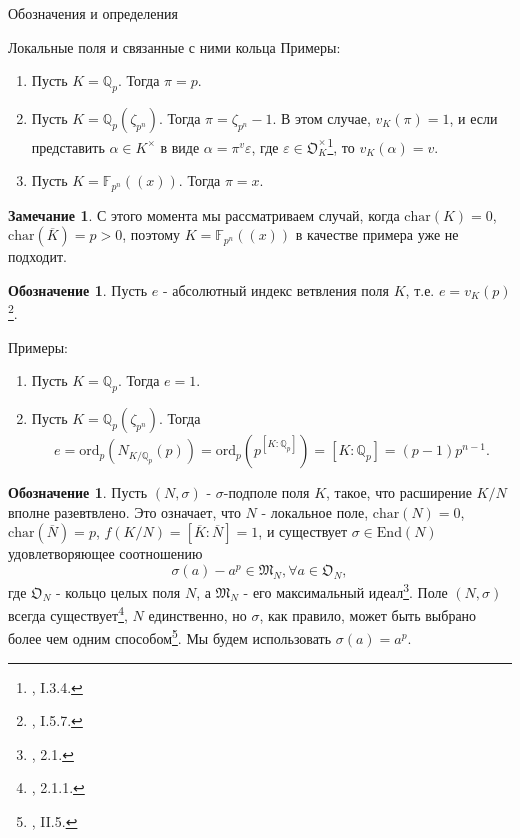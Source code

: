 \documentclass[a4paper,14pt]{extarticle}
\theoremstyle{definition}
\newtheorem{denotation}[definition]{Обозначение}
\newtheorem{remark}{Замечание}[section]
\newcommand{\ord}{\mathrm{ord}}
\newcommand{\End}[1]{\mathrm{End}\left(#1\right)}
\newcommand{\fchar}[1]{\mathrm{char}\left(#1\right)}
\newcommand{\bF}{\mathbb{F}}
\newcommand{\bQ}{\mathbb{Q}}
\newcommand{\fM}{\mathfrak{M}}
\newcommand{\fO}{\mathfrak{O}}
\begin{document}
\begin{section}{Обозначения и определения}
\begin{subsection}{Локальные поля и связанные с ними кольца}
Примеры:
\begin{enumerate}
    \item Пусть ${ K = \bQ_p }$. Тогда ${ \pi = p }$.
    \item Пусть ${ K = \bQ_p(\zeta_{p^n}) }$. Тогда ${ \pi = \zeta_{p^n} - 1 }$. В этом случае, ${ v_K(\pi) = 1 }$, и если представить ${ \alpha \in K^\times }$ в виде ${ \alpha = \pi^v \varepsilon }$, где ${ \varepsilon \in \fO_K^\times }$\footnote{
        \cite{FesenkoVostokov}, I.3.4.
    }, то ${ v_K(\alpha) = v }$.
    \item Пусть ${ K = \bF_{p^n}((x)) }$. Тогда ${ \pi = x }$.
\end{enumerate}

\begin{remark}\label{remark:1.before_e:K}
    С этого момента мы рассматриваем случай, когда ${ \fchar{K} = 0 }$, ${ \fchar{\overline{K}} = p > 0 }$, поэтому ${ K = \bF_{p^n}((x)) }$ в качестве примера уже не подходит.
\end{remark}

\begin{denotation}\label{denote:1.2:e}
    Пусть $e$ - абсолютный индекс ветвления поля $K$, т.е. ${ e = v_K(p) }$\footnote{
        \cite{FesenkoVostokov}, I.5.7.
    }.
\end{denotation}

Примеры:
\begin{enumerate}
    \item Пусть ${ K = \bQ_p }$. Тогда ${ e = 1 }$.
    \item Пусть ${ K = \bQ_p(\zeta_{p^n}) }$. Тогда
    \begin{equation*}
        e =
        \ord_p\left(N_{K/\bQ_p}(p)\right) =
        \ord_p\left(p^{[K : \bQ_p]}\right) =
        [K : \bQ_p] =
        (p - 1) p^{n - 1}.
    \end{equation*}
\end{enumerate}

\begin{denotation}\label{denote:1.4:N}
    Пусть ${ (N, \sigma) }$ - $\sigma$-подполе поля $K$, такое, что расширение ${ K/N }$ вполне разевтвлено. Это означает, что $N$ - локальное поле, ${ \fchar{N} = 0 }$, ${ \fchar{\overline{N}} = p }$, ${ f(K/N) = [\overline{K} : \overline{N}] = 1 }$, и существует ${ \sigma \in \End{N} }$ удовлетворяющее соотношению
    \begin{equation*}
        \sigma(a) - a^p \in \fM_N, \forall a \in \fO_N,
    \end{equation*}
    где $\fO_N$ - кольцо целых поля $N$, а $\fM_N$ - его максимальный идеал\footnote{
        \cite{BondarkoThesis}, 2.1.
    }. Поле ${ (N, \sigma) }$ всегда существует\footnote{
        \cite{BondarkoThesis}, 2.1.1.
    }, $N$ единственно, но $\sigma$, как правило, может быть выбрано более чем одним способом\footnote{
        \cite{FesenkoVostokov}, II.5.
    }. Мы будем использовать ${ \sigma(a) = a^p }$.
\end{denotation}


\end{subsection}
\end{section}
\end{document}
